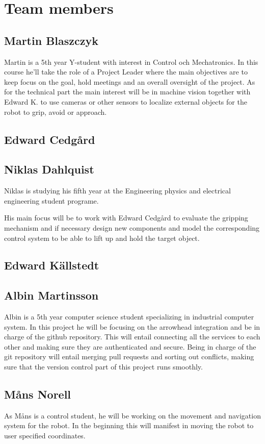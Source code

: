\section{Team members}

\subsection{Martin Blaszczyk}
Martin is a 5th year Y-student with interest in Control och Mechatronics. 
In this course he'll take the role of a Project Leader where the main objectives
are to keep focus on the goal, hold meetings and an overall oversight of the project. 
As for the technical part the main interest will be in machine vision together with
Edward K. to use cameras or other sensors to localize external objects for the 
robot to grip, avoid or approach. 

\subsection{Edward Cedgård}

\subsection{Niklas Dahlquist}
Niklas is studying his fifth year at the Engineering physics and electrical engineering student programe.

His main focus will be to work with Edward Cedgård to evaluate the gripping mechanism and if necessary design new components and model the corresponding control system to be able to lift up and hold the target object.

\subsection{Edward Källstedt}

\subsection{Albin Martinsson}
Albin is a 5th year computer science student specializing in industrial computer system. In this project he will be focusing on the 
arrowhead integration and be in charge of the github repository. This will entail connecting all the services to each other and
making sure they are authenticated and secure. Being in charge of the git repository will entail merging pull requests and sorting
out conflicts, making sure that the version control part of this project runs smoothly.

\subsection{Måns Norell}
As Måns is a control student, he will be working on the movement and navigation system for the robot. In the beginning this will manifest in moving the robot to user specified coordinates.









